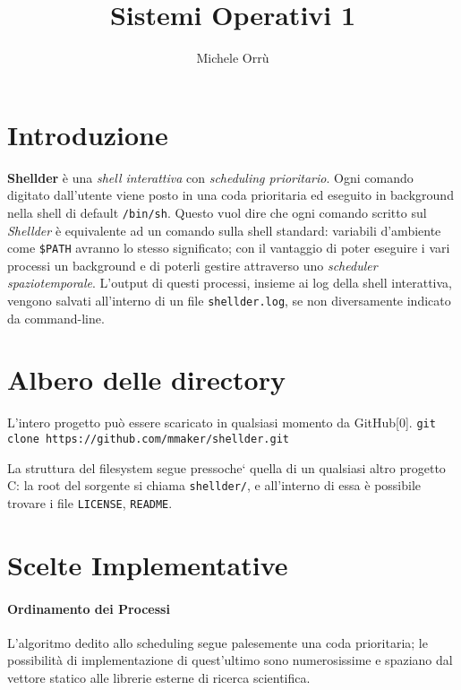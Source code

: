 \documentclass[11pt]{article}
\title{\textbf{Sistemi Operativi 1}}
\author{Michele Orr\`u}
\date{}
\begin{document}
\maketitle

\section{Introduzione}

\textbf{Shellder} \`e una \emph{shell interattiva} con \emph{scheduling prioritario}.
Ogni comando digitato dall'utente viene posto in una coda prioritaria ed eseguito in background nella shell di
default \texttt{/bin/sh}. Questo vuol dire che ogni comando scritto sul \emph{Shellder} \`e equivalente ad un
comando sulla shell standard: variabili d'ambiente come \texttt{\$PATH} avranno lo stesso significato;
con il vantaggio di poter eseguire i vari processi un background e di poterli gestire attraverso uno 
\emph{scheduler spaziotemporale}.
L'output di questi processi, insieme ai log della shell interattiva, vengono salvati all'interno di un file 
\texttt{shellder.log}, se non diversamente indicato da command-line.

\section{Albero delle directory}

L'intero progetto pu\`o essere scaricato in qualsiasi momento da GitHub[0].
\texttt{git clone https://github.com/mmaker/shellder.git}

La struttura del filesystem segue pressoche` quella di un qualsiasi altro progetto C: la root del sorgente si chiama \texttt{shellder/}, e all'interno di essa \`e possibile trovare i file \texttt{LICENSE}, \texttt{README}.


\section{Scelte Implementative}

\paragraph{Ordinamento dei Processi\\}
L'algoritmo dedito allo scheduling segue palesemente una coda prioritaria;
le possibilit\`a di implementazione di quest'ultimo sono numerosissime e
spaziano dal vettore statico alle librerie esterne di ricerca scientifica.
\end{document}
